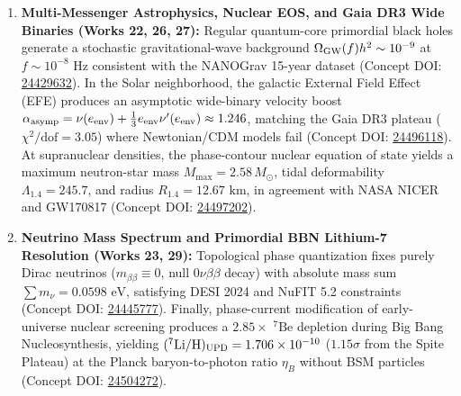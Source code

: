 \documentclass[11pt,a4paper]{article}
\theoremstyle{definition}
\begin{document}
\begin{enumerate}
\item \textbf{Multi-Messenger Astrophysics, Nuclear EOS, and Gaia DR3 Wide Binaries (Works 22, 26, 27):}
Regular quantum-core primordial black holes generate a stochastic gravitational-wave background $\Omega_{\rm GW}(f) h^2 \sim 10^{-9}$ at $f \sim 10^{-8}\text{ Hz}$ consistent with the NANOGrav 15-year dataset (Concept DOI: \href{https://doi.org/10.5281/zenodo.24429632}{24429632}). In the Solar neighborhood, the galactic External Field Effect (EFE) produces an asymptotic wide-binary velocity boost $\alpha_{\rm asymp} = \nu(e_{\rm env}) + \frac{1}{3}e_{\rm env}\nu'(e_{\rm env}) \approx 1.246$, matching the Gaia DR3 plateau ($\chi^2/\mathrm{dof} = 3.05$) where Newtonian/CDM models fail (Concept DOI: \href{https://doi.org/10.5281/zenodo.24496118}{24496118}). At supranuclear densities, the phase-contour nuclear equation of state yields a maximum neutron-star mass $M_{\max} = 2.58\,M_\odot$, tidal deformability $\Lambda_{1.4} = 245.7$, and radius $R_{1.4} = 12.67\text{ km}$, in agreement with NASA NICER and GW170817 (Concept DOI: \href{https://doi.org/10.5281/zenodo.24497202}{24497202}).

\item \textbf{Neutrino Mass Spectrum and Primordial BBN Lithium-7 Resolution (Works 23, 29):}
Topological phase quantization fixes purely Dirac neutrinos ($m_{\beta\beta} \equiv 0$, null $0\nu\beta\beta$ decay) with absolute mass sum $\sum m_\nu = 0.0598\text{ eV}$, satisfying DESI 2024 and NuFIT 5.2 constraints (Concept DOI: \href{https://doi.org/10.5281/zenodo.24445777}{24445777}). Finally, phase-current modification of early-universe nuclear screening produces a $2.85\times$ $^7\text{Be}$ depletion during Big Bang Nucleosynthesis, yielding $(^7\text{Li}/\text{H})_{\rm UPD} = 1.706 \times 10^{-10}$ ($1.15\sigma$ from the Spite Plateau) at the Planck baryon-to-photon ratio $\eta_B$ without BSM particles (Concept DOI: \href{https://doi.org/10.5281/zenodo.24504272}{24504272}).
\end{enumerate}
\end{document}
